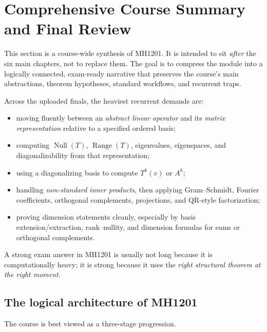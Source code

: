 \section{Comprehensive Course Summary and Final Review}
\label{sec:mh1201-course-summary}

This section is a course-wide synthesis of MH1201. It is intended to sit \emph{after} the six main chapters, not to replace them. The goal is to compress the module into a logically connected, exam-ready narrative that preserves the course's main abstractions, theorem hypotheses, standard workflows, and recurrent traps.

\begin{examtip}[title={Exam Focus: what the recent finals reward most strongly}]
Across the uploaded finals, the heaviest recurrent demands are:
\begin{itemize}[leftmargin=*]
    \item moving fluently between an \emph{abstract linear operator} and its \emph{matrix representation} relative to a specified ordered basis;
    \item computing \(\operatorname{Null}(T)\), \(\operatorname{Range}(T)\), eigenvalues, eigenspaces, and diagonalizability from that representation;
    \item using a diagonalizing basis to compute \(T^k(v)\) or \(A^k\);
    \item handling \emph{non-standard inner products}, then applying Gram--Schmidt, Fourier coefficients, orthogonal complements, projections, and QR-style factorization;
    \item proving dimension statements cleanly, especially by basis extension/extraction, rank--nullity, and dimension formulas for sums or orthogonal complements.
\end{itemize}
A strong exam answer in MH1201 is usually not long because it is computationally heavy; it is strong because it uses the \emph{right structural theorem at the right moment}.
\end{examtip}

\subsection{The logical architecture of MH1201}

The course is best viewed as a three-stage progression.

